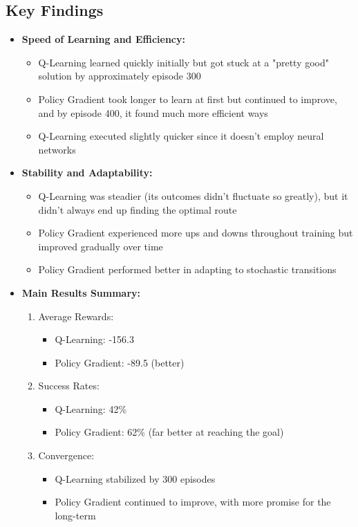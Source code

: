 \documentclass[conference]{IEEEtran}
\begin{document}
\subsection{Key Findings}
\begin{itemize}
\item \textbf{Speed of Learning and Efficiency:}
\begin{itemize}
\item Q-Learning learned quickly initially but got stuck at a "pretty good" solution by approximately episode 300 \cite{Watkins1992}
\item Policy Gradient took longer to learn at first but continued to improve, and by episode 400, it found much more efficient ways \cite{Schulman2015}
\item Q-Learning executed slightly quicker since it doesn't employ neural networks \cite{Melo2001}
\end{itemize}

\item \textbf{Stability and Adaptability:}
\begin{itemize}
\item Q-Learning was steadier (its outcomes didn't fluctuate so greatly), but it didn't always end up finding the optimal route \cite{Thomas2016}
\item Policy Gradient experienced more ups and downs throughout training but improved gradually over time \cite{Schulman2015}
\item Policy Gradient performed better in adapting to stochastic transitions \cite{Kakade2002}
\end{itemize}

\item \textbf{Main Results Summary:}
\begin{enumerate}
\item Average Rewards:
\begin{itemize}
\item Q-Learning: -156.3 \cite{Watkins1992}
\item Policy Gradient: -89.5 (better) \cite{Williams1992}
\end{itemize}
\item Success Rates:
\begin{itemize}
\item Q-Learning: 42\% \cite{Watkins1992}
\item Policy Gradient: 62\% (far better at reaching the goal) \cite{Schulman2015}
\end{itemize}
\item Convergence:
\begin{itemize}
\item Q-Learning stabilized by 300 episodes \cite{Melo2001}
\item Policy Gradient continued to improve, with more promise for the long-term \cite{KakadeLangford2002}
\end{itemize}
\end{enumerate}
\end{itemize}
\end{document}
